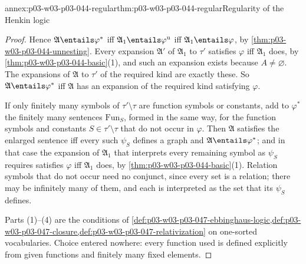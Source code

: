 \begin{annexitem}{annex:p03-w03-p03-044-regular}{thm:p03-w03-p03-044-regular}{Regularity of the Henkin logic}
\begin{proof}
Hence \(\mathfrak A\entails\varphi^\ast\) iff \(\mathfrak A_1\entails
\varphi^{\mathrm u}\) iff \(\mathfrak A_1\entails\varphi\), by
\cref{thm:p03-w03-p03-044-unnesting}.  Every expansion \(\mathfrak A'\) of
\(\mathfrak A_1\) to \(\tau'\) satisfies \(\varphi\) iff \(\mathfrak A_1\)
does, by \cref{thm:p03-w03-p03-044-basic}(1), and such an expansion exists
because \(A\neq\varnothing\).  The expansions of \(\mathfrak A\) to \(\tau'\)
of the required kind are exactly these.  So \(\mathfrak A\entails
\varphi^\ast\) iff \(\mathfrak A\) has an expansion of the required kind
satisfying \(\varphi\).

If only finitely many symbols of \(\tau'\setminus\tau\) are function
symbols or constants, add to \(\varphi^\ast\) the finitely many sentences
\(\mathrm{Fun}_S\), formed in the same way, for the function symbols and
constants \(S\in\tau'\setminus\tau\) that do not occur in \(\varphi\).
Then \(\mathfrak A\) satisfies the enlarged sentence iff every such
\(\psi_S\) defines a graph and \(\mathfrak A\entails\varphi^\ast\); and in
that case the expansion of \(\mathfrak A_1\) that interprets every
remaining symbol as \(\psi_S\) requires satisfies \(\varphi\) iff
\(\mathfrak A_1\) does, by \cref{thm:p03-w03-p03-044-basic}(1).  Relation
symbols that do not occur need no conjunct, since every set is a relation;
there may be infinitely many of them, and each is interpreted as the set
that its \(\psi_S\) defines.

Parts (1)--(4) are the conditions of
\cref{def:p03-w03-p03-047-ebbinghaus-logic,def:p03-w03-p03-047-closure,def:p03-w03-p03-047-relativization}
on one-sorted vocabularies.  Choice entered nowhere: every function used is
defined explicitly from given functions and finitely many fixed elements.
\end{proof}
\end{annexitem}

